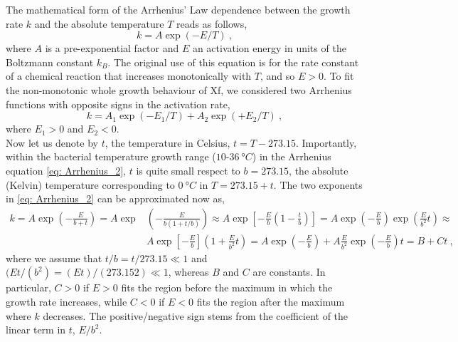 The mathematical form of the Arrhenius' Law dependence between the growth
rate $k$ and the absolute temperature $T$ reads as follows,
\begin{equation}
    k = A \exp(-E/T) \ ,
\end{equation}
where $A$ is a pre-exponential factor and $E$ an activation energy in units
of the Boltzmann constant $k_B$. The original use of this equation is for the
rate constant of a chemical reaction that increases monotonically with $T$, and
so $E>0$.  To fit the non-monotonic whole growth behaviour of Xf, we considered
two Arrhenius functions with opposite signs in the activation rate,
\begin{equation}\label{eq: Arrhenius_2}
    k =A_1 \exp(-E_1/T) + A_2 \exp(+E_2/T) \ ,
\end{equation}
where $E_1>0$ and $E_2<0$.\\

Now let us denote by $t$, the temperature in Celsius, $t= T-273.15$.
Importantly, within the bacterial temperature growth range
($10$-$\SI{36}{\degree C}$) in the Arrhenius equation \cref{eq: Arrhenius_2},
$t$ is quite small respect to $b = 273.15$, the absolute (Kelvin) temperature
corresponding to $\SI{0}{\degree C}$ in $T = 273.15 + t$. The two exponents in
\cref{eq: Arrhenius_2} can be approximated now as,
\begin{equation}
    \begin{aligned}
        k=A \exp \left(-\frac{E}{b+t}\right)=A \exp & \left(-\frac{E}{b(1+t /
                b)}\right) \approx A \exp
        \left[-\frac{E}{b}\left(1-\frac{t}{b}\right)\right]=A
        \exp \left(-\frac{E}{b}\right) \exp \left(\frac{E}{b^{2}} t\right)
        \approx
        \\
                                                    & A \exp
        \left[-\frac{E}{b}\right]\left(1+\frac{E}{b^{2}} t\right)=A
        \exp \left(-\frac{E}{b}\right)+A \frac{E}{b^{2}} \exp
        \left(-\frac{E}{b}\right)
        t=B+C t \ ,
    \end{aligned}
    \label{eq:tempapprox}
\end{equation}
where we assume that $t/b = t/273.15 \ll1$ and	$(Et/(b^2) = (Et)/(273.152)
    \ll1$, whereas $B$ and $C$ are constants. In particular, $C>0$ if $E>0$
fits
the region before the maximum in which the growth rate increases, while $C<0$
if $E<0$ fits the region after the maximum where $k$ decreases. The
positive/negative sign stems from the coefficient of the linear term in $t$,
$E/b^2$.

